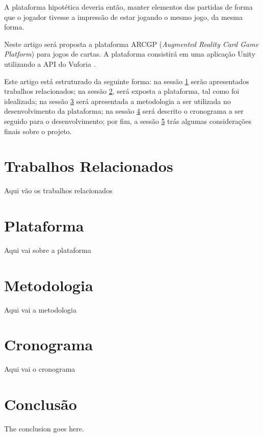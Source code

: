 \documentclass[conference]{IEEEtran}
\begin{document}
A plataforma hipotética deveria então, manter elementos das partidas de forma 
que o jogador tivesse a impressão de estar jogando o mesmo jogo, da mesma forma.

Neste artigo será proposta a plataforma ARCGP (\textit{Augmented Reality Card 
Game Platform}) para jogos de cartas. A plataforma consistirá em uma aplicação 
Unity \cite{unity} utilizando a API do Vuforia \cite{vuforia}. 

Este artigo está estruturado da seguinte forma: na sessão \ref{rel} serão 
apresentados trabalhos relacionados; na sessão \ref{plataforma}, será 
exposta a plataforma, tal como foi idealizada; na sessão \ref{metodologia} será 
apresentada a metodologia a ser utilizada no desenvolvimento da plataforma; na 
sessão \ref{cronograma} será descrito o cronograma a ser seguido para o 
desenvolvimento; por fim, a sessão \ref{conclusao} trás algumas considerações 
finais sobre o projeto.

\section{Trabalhos Relacionados}
\label{rel}
Aqui vão os trabalhos relacionados

\section{Plataforma}
\label{plataforma}
Aqui vai sobre a plataforma

\section{Metodologia}
\label{metodologia}
Aqui vai a metodologia

\section{Cronograma}
\label{cronograma}
Aqui vai o cronograma

\section{Conclusão}
\label{conclusao}
The conclusion goes here.



\end{document}
